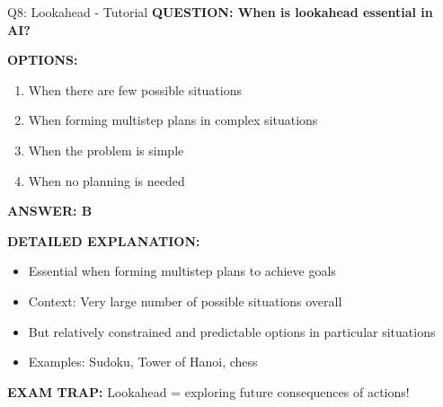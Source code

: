 \documentclass[8pt]{beamer}
\begin{document}
	\begin{frame}{Q8: Lookahead - Tutorial}
		\fontsize{6.5}{7.5}\selectfont
		\textbf{QUESTION: When is lookahead essential in AI?}
		
		\vspace{0.1cm}
		\textbf{OPTIONS:}
		\begin{enumerate}
			\item When there are few possible situations
			\item When forming multistep plans in complex situations
			\item When the problem is simple
			\item When no planning is needed
		\end{enumerate}
		
		\vspace{0.1cm}
		\textcolor{myblue}{\textbf{ANSWER: B}}
		
		\vspace{0.1cm}
		\textbf{DETAILED EXPLANATION:}
		\begin{itemize}
			\item Essential when forming multistep plans to achieve goals
			\item Context: Very large number of possible situations overall
			\item But relatively constrained and predictable options in particular situations
			\item Examples: Sudoku, Tower of Hanoi, chess
		\end{itemize}
		
		\vspace{0.1cm}
		\textcolor{myred}{\textbf{EXAM TRAP:}} Lookahead = \textcolor{myblue}{exploring future consequences} of actions!
	\end{frame}
	
\end{document}
